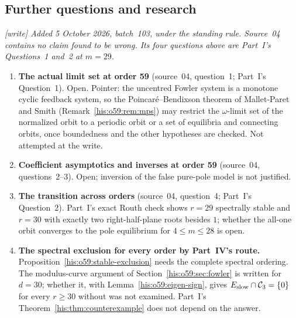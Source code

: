 \documentclass[11pt]{article}
\theoremstyle{remark}\newtheorem{remark}[theorem]{Remark}
\numberwithin{equation}{section}
\begin{document}
\subsection{Further questions and research}\label{his:o59:sec:further}
\emph{\textsf{[write]} Added 5 October 2026, batch~103, under the standing rule. Source~04 contains no claim found to be wrong. Its four questions above are Part~I's Questions~1 and~2 at $m=29$.}
\begin{enumerate}
\item \textbf{The actual limit set at order 59} (source~04, question~1; Part~I's Question~1). Open. Pointer: the uncentred Fowler system is a monotone cyclic feedback system, so the Poincar\'e--Bendixson theorem of Mallet-Paret and Smith (Remark~\ref{his:o59:rem:mps}) may restrict the $\omega$-limit set of the normalized orbit to a periodic orbit or a set of equilibria and connecting orbits, once boundedness and the other hypotheses are checked. Not attempted at the write.
\item \textbf{Coefficient asymptotics and inverses at order 59} (source~04, questions~2--3). Open; inversion of the false pure-pole model is not justified.
\item \textbf{The transition across orders} (source~04, question~4; Part~I's Question~2). Part~I's exact Routh check shows $r=29$ spectrally stable and $r=30$ with exactly two right-half-plane roots besides $1$; whether the all-one orbit converges to the pole equilibrium for $4\le m\le28$ is open.
\item \textbf{The spectral exclusion for every order by Part~IV's route.} Proposition~\ref{his:o59:stable-exclusion} needs the complete spectral ordering. The modulus-curve argument of Section~\ref{his:o59:sec:fowler} is written for $d=30$; whether it, with Lemma~\ref{his:o59:eigen-sign}, gives $E_{\rm slow}\cap\mathcal C_3=\{0\}$ for every $r\ge30$ without \cite{alseidi2019} was not examined. Part~I's Theorem~\ref{his:thm:counterexample} does not depend on the answer.
\end{enumerate}
\end{document}
